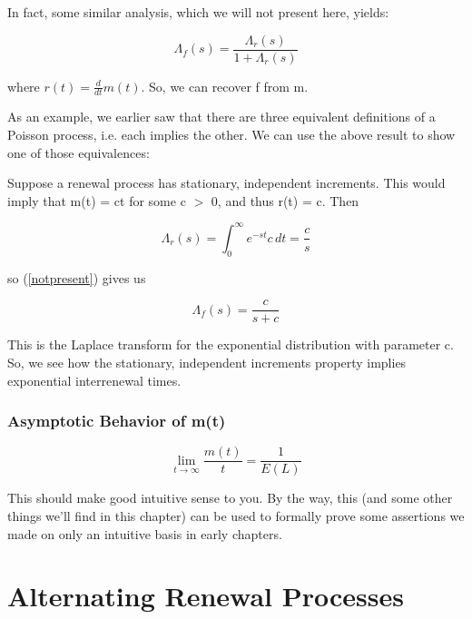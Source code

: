 In fact, some similar analysis, which we will not present here, yields:

\begin{equation}
\label{notpresent}
\Lambda _{f}(s)=\frac{\Lambda _{r}(s)}{1+\Lambda _{r}(s)}
\end{equation}

where $r(t)=\frac{d}{dt}m(t)$.   So, we can recover f from m.

As an example, we earlier saw that there are three equivalent
definitions of a Poisson process, i.e. each implies the other. We can
use the above result to show one of those equivalences:

Suppose a renewal process has stationary, independent increments. This
would imply that m(t) = ct for some c $>$ 0, and thus r(t) = c. Then

\begin{equation}
\Lambda _{r}(s)=\int ^{\infty }_{0}e^{-st}c\, dt=\frac{c}{s}
\end{equation}

so (\ref{notpresent}) gives us

\begin{equation}
\Lambda _{f}(s)=\frac{c}{s+c}
\end{equation}

This is the Laplace transform for the exponential distribution with
parameter c. So, we see how the stationary, independent increments
property implies exponential interrenewal times.


\subsubsection{Asymptotic Behavior of m(t)}

\begin{theorem}

\begin{equation}
\label{key}
\lim_{t\rightarrow \infty }\frac{m(t)}{t}=\frac{1}{E(L)}
\end{equation}

\end{theorem}

This should make good intuitive sense to you.  By the way, this (and
some other things we'll find in this chapter) can be used to formally prove
some assertions we made on only an intuitive basis in early chapters.

\section{Alternating Renewal Processes}

